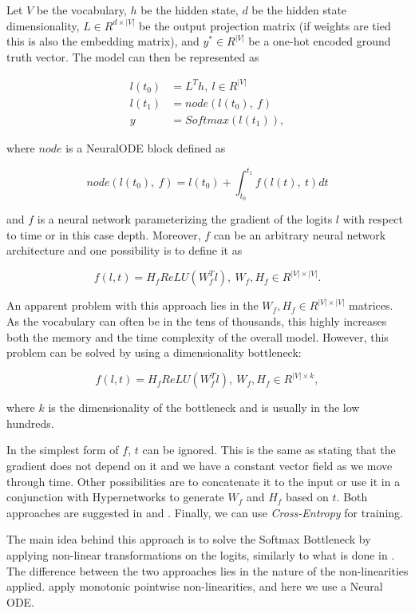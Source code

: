 Let $ V $ be the vocabulary, $ h $ be the hidden state, $ d $ be the hidden state dimensionality, $ L \in R^{d \times |V|} $ be the output projection matrix (if weights are tied \citep{inan2016tying} this is also the embedding matrix), and $ y^* \in R^{|V|} $ be a one-hot encoded ground truth vector. The model can then be represented as

\begin{align*}
    l(t_0) &= L^T h, \ l \in R^{|V|} \\
    l(t_1) &= node(l(t_0), \ f) \\
    y &= Softmax(l(t_1)),
\end{align*}

where $ node $ is a NeuralODE block defined as

\begin{displaymath}
    node(l(t_0), \ f) = l(t_0) + \int_{t_0}^{t_1} f(l(t), \ t) dt    
\end{displaymath}

and $ f $ is a neural network parameterizing the gradient of the logits $ l $ with respect to time or in this case depth. Moreover, $ f $ can be an arbitrary neural network architecture and one possibility is to define it as

\begin{displaymath}
    f(l, t) = H_f ReLU(W_f^T l), \ W_f, H_f \in R^{|V| \times |V|}.    
\end{displaymath}

An apparent problem with this approach lies in the $ W_f, H_f \in R^{ |V| \times |V| } $ matrices. As the vocabulary can often be in the tens of thousands, this highly increases both the memory and the time complexity of the overall model. However, this problem can be solved by using a dimensionality bottleneck:

\begin{displaymath}
    f(l, t) = H_f ReLU(W_f^T l), \ W_f, H_f \in R^{|V| \times k},
\end{displaymath}

where $ k $ is the dimensionality of the bottleneck and is usually in the low hundreds.

In the simplest form of $ f $, $ t $ can be ignored. This is the same as stating that the gradient does not depend on it and we have a constant vector field as we move through time. Other possibilities are to concatenate it to the input or use it in a conjunction with Hypernetworks \citep{ha2016hypernetworks} to generate $ W_f $ and $ H_f $ based on $ t $. Both approaches are suggested in \citet{chen2018neural} and \citet{grathwohl2018ffjord}. Finally, we can use \emph{Cross-Entropy} for training.

The main idea behind this approach is to solve the Softmax Bottleneck by applying non-linear transformations on the logits, similarly to what is done in \citep{ganea2019breaking}. The difference between the two approaches lies in the nature of the non-linearities applied. \citet{ganea2019breaking} apply monotonic pointwise non-linearities, and here we use a Neural ODE.
